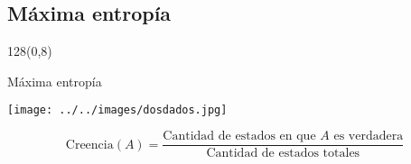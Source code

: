 \documentclass[shownotes]{beamer}
\begin{document}
\begin{frame}
 
 



\end{frame}

 \subsection{M\'axima entrop\'ia}
  \begin{frame}
 \begin{textblock}{128}(0,8)
 \begin{center}
 \large M\'axima entrop\'ia 
 \end{center}
 \end{textblock}
\vspace{-1cm}
 
 \begin{center}
\texttt{[image: ../../images/dosdados.jpg]}
 \end{center}
 
  \pause
 
 \vspace{0.5cm}
 
 \begin{equation*}
  \text{Creencia}(A) = \frac{\text{Cantidad de estados en que $A$ es verdadera}}{\text{Cantidad de estados totales}}
 \end{equation*}
 
 \end{frame}
\end{document}
